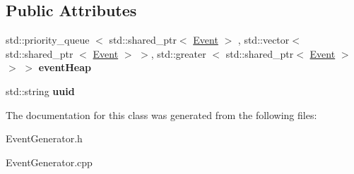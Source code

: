\subsection*{\-Public \-Attributes}
\begin{DoxyCompactItemize}
\item 
\hypertarget{classEventGenerator_a3e9a33f75d9861bece6c30b5249c9d39}{std\-::priority\-\_\-queue\*
$<$ std\-::shared\-\_\-ptr$<$ \hyperlink{classEvent}{\-Event} $>$\*
, std\-::vector$<$ std\-::shared\-\_\-ptr\*
$<$ \hyperlink{classEvent}{\-Event} $>$ $>$, std\-::greater\*
$<$ std\-::shared\-\_\-ptr$<$ \hyperlink{classEvent}{\-Event} $>$ $>$ $>$ {\bfseries event\-Heap}}\label{classEventGenerator_a3e9a33f75d9861bece6c30b5249c9d39}

\item 
\hypertarget{classEventGenerator_af4fa28d08ed4a3be31f9383cf72e0d2c}{std\-::string {\bfseries uuid}}\label{classEventGenerator_af4fa28d08ed4a3be31f9383cf72e0d2c}

\end{DoxyCompactItemize}


\-The documentation for this class was generated from the following files\-:\begin{DoxyCompactItemize}
\item 
\-Event\-Generator.\-h\item 
\-Event\-Generator.\-cpp\end{DoxyCompactItemize}
